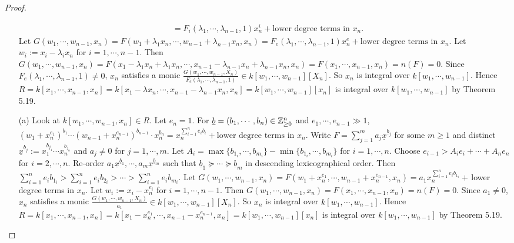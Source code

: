 \begin{proof}
\begin{enumerate}
\begin{align*}
                &= F_i(\lambda_1,\cdots,\lambda_{n-1},1)x_n^{i} + \text{lower degree terms in $x_n$}. 
            \end{align*}
            Let $G(w_1,\cdots,w_{n-1},x_n) = F(w_1+\lambda_1x_n,\cdots,w_{n-1}+\lambda_{n-1}x_n,x_n) = F_e(\lambda_1,\cdots,\lambda_{n-1},1)x_n^{e} + \text{lower degree terms in $x_n$}$. Let $w_i := x_i-\lambda_ix_n$ for $i = 1,\cdots,n-1$. Then $G(w_1,\cdots,w_{n-1},x_n) = F(x_1-\lambda_1x_n+\lambda_1x_n,\cdots,x_{n-1}-\lambda_{n-1}x_n + \lambda_{n-1}x_n,x_n) = F(x_1,\cdots,x_{n-1},x_n) = n(F) = 0$. Since $F_e(\lambda_1,\cdots,\lambda_{n-1},1) \neq 0$, $x_n$ satisfies a monic $\frac{G(w_1,\cdots,w_{n-1},X_n)}{F_e(\lambda_1,\cdots,\lambda_{n-1},1)} \in k[w_1,\cdots,w_{n-1}][X_n]$. So $x_n$ is integral over $k[w_1,\cdots,w_{n-1}]$. Hence $R = k[x_1,\cdots,x_{n-1},x_n] = k[x_1-\lambda x_n,\cdots,x_{n-1}-\lambda_{n-1}x_n,x_n] = k[w_1,\cdots,w_{n-1}][x_n]$ is integral over $k[w_1,\cdots,w_{n-1}]$ by Theorem 5.19. \par 
        \item[(a)]   
            Look at $k[w_1,\cdots,w_{n-1},x_n] \in R$. Let $e_n = 1$. For $\underline b = (b_1,\cdots,b_n) \in \mathbb{Z}_{\geq 0}^{n}$ and $e_1,\cdots,e_{n-1} \gg 1$, $(w_1+x_n^{e_1})^{b_1} \cdots (w_{n-1} + x_n^{e_{n-1}})^{b_{n-1}} \cdot x_n^{b_n} = x_n^{\sum_{i=1}^{n}e_ib_i} + \text{lower degree terms in $x_n$}$. Write $F = \sum_{j=1}^{m} a_j \underline x^{\underline b_j}$ for some $m \geq 1$ and distinct $\underline x^{\underline b_j} := x_1^{b_{j_1}} \cdots x_n^{b_{j_n}}$ and $a_j \neq 0$ for $j = 1,\cdots,m$. Let $A_i = \max\{b_{1_i},\cdots,b_{m_i}\} - \min\{b_{1_i},\cdots,b_{m_i}\}$ for $i = 1,\cdots,n$. Choose $e_{i-1} > A_ie_i + \cdots + A_ne_n$ for $i = 2,\cdots,n$. Re-order $a_1 \underline x^{\underline b_1},\cdots,a_m \underline x^{\underline b_m}$ such that $\underline b_1 \succcurlyeq \cdots \succcurlyeq \underline b_m$ in descending lexicographical order. Then $\sum_{i=1}^{n}e_ib_{1_i} > \sum_{i=1}^{n} e_ib_{2_i} > \cdots > \sum_{i=1}^{n} e_ib_{m_i}$. Let $G(w_1,\cdots,w_{n-1},x_n) = F(w_1+x_n^{e_1},\cdots,w_{n-1}+x_n^{e_{n-1}},x_n) = a_1x_n^{\sum_{i=1}^{n}e_ib_{1_i}}+\,$lower degree terms in $x_n$. Let $w_i := x_i-x_n^{e_i}$ for $i = 1,\cdots,n-1$. Then $G(w_1,\cdots,w_{n-1},x_n) = F(x_1,\cdots,x_{n-1},x_n) = n(F) = 0$. Since $a_1 \neq 0$, $x_n$ satisfies a monic $\frac{G(w_1,\cdots,w_{n-1},X_n)}{a_1} \in k[w_1,\cdots,w_{n-1}][X_n]$. So $x_n$ is integral over $k[w_1,\cdots,w_{n-1}]$. Hence $R = k[x_1,\cdots,x_{n-1},x_n] = k[x_1-x_n^{e_1},\cdots,x_{n-1}-x_{n}^{e_{n-1}},x_n] = k[w_1,\cdots,w_{n-1}][x_n]$ is integral over $k[w_1,\cdots,w_{n-1}]$ by Theorem 5.19. \qedhere
    \end{enumerate}
\end{proof}

